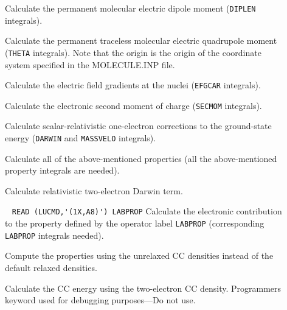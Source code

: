\begin{description}
\item[] 
        Calculate the permanent molecular electric dipole moment
        (\verb+DIPLEN+ integrals).
%
\item[] 
        Calculate the permanent traceless molecular electric
        quadrupole moment (\verb+THETA+ integrals). Note that the
        origin is the origin of the coordinate system specified
        in the MOLECULE.INP file.
%
\item[] 
        Calculate the electric field gradients at the nuclei
        (\verb+EFGCAR+ integrals).
%
\item[] 
        Calculate the electronic second moment of charge
        (\verb+SECMOM+ integrals).
%
\item[] 
        Calculate scalar-relativistic one-electron
        corrections to the ground-state
        energy (\verb+DARWIN+ and \verb+MASSVELO+ integrals).
%
\item[] 
        Calculate all of the above-mentioned properties (all the
        above-mentioned property integrals are needed).
%
\item[] 
        Calculate relativistic two-electron Darwin term.
%
\item[] \verb| |\newline
\verb|READ (LUCMD,'(1X,A8)') LABPROP|\newline
        Calculate the electronic contribution to the property defined
        by the operator label \verb+LABPROP+ (corresponding 
        \verb+LABPROP+ integrals needed).
%
\item[] 
        Compute the properties using the unrelaxed CC densities instead
        of the default relaxed densities.
%
\item[] 
        Calculate the CC energy using the two-electron CC density.
        Programmers keyword used for debugging purposes---Do not use.
%
\end{description}
